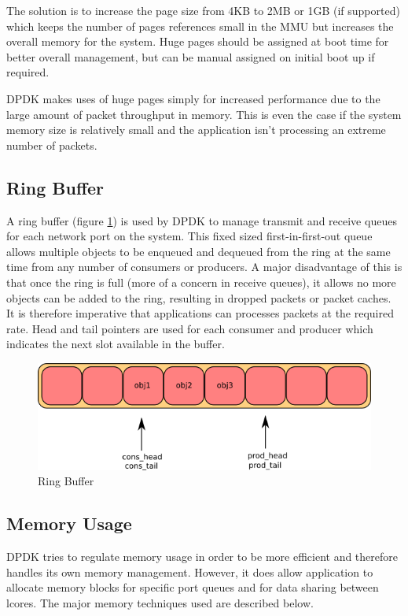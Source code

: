 \documentclass[final_report.tex]{subfiles}
\begin{document}
The solution is to increase the page size from 4KB to 2MB or 1GB (if supported) which keeps the number of pages references small in the MMU but increases the overall memory for the system. Huge pages should be assigned at boot time for better overall management, but can be manual assigned on initial boot up if required.

DPDK makes uses of huge pages simply for increased performance due to the large amount of packet throughput in memory. This is even the case if the system memory size is relatively small and the application isn't processing an extreme number of packets.

\subsection{Ring Buffer}
A ring buffer (figure \ref{fig:ring}) is used by DPDK to manage transmit and receive queues for each network port on the system. This fixed sized first-in-first-out queue allows multiple objects to be enqueued and dequeued from the ring at the same time from any number of consumers or producers. A major disadvantage of this is that once the ring is full (more of a concern in receive queues), it allows no more objects can be added to the ring, resulting in dropped packets or packet caches. It is therefore imperative that applications can processes packets at the required rate. Head and tail pointers are used for each consumer and producer which indicates the next slot available in the buffer.

\begin{figure}[H]
	\centering
	\includegraphics[width=\textwidth]{img/ring.png}
	\caption{Ring Buffer}
	\label{fig:ring}
\end{figure}

\newpage

\subsection{Memory Usage}
DPDK tries to regulate memory usage in order to be more efficient and therefore handles its own memory management. However, it does allow application to allocate memory blocks for specific port queues and for data sharing between lcores. The major memory techniques used are described below.
\end{document}
